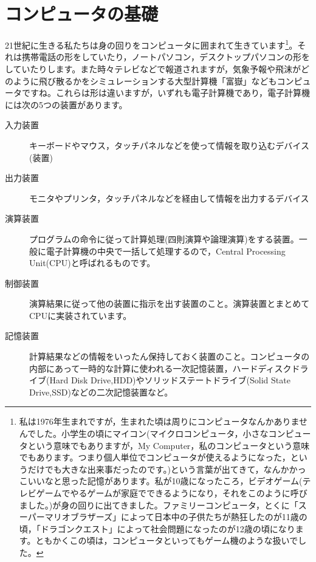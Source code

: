 \documentclass{ltjsbook}
\begin{document}
\section{コンピュータの基礎}
21世紀に生きる私たちは身の回りをコンピュータに囲まれて生きています\footnote{私は1976年生まれですが，生まれた頃は周りにコンピュータなんかありませんでした。小学生の頃にマイコン(マイクロコンピュータ，小さなコンピュータという意味でもありますが，My Computer，私のコンピュータという意味でもあります。つまり個人単位でコンピュータが使えるようになった，というだけでも大きな出来事だったのです。)という言葉が出てきて，なんかかっこいいなと思った記憶があります。私が10歳になったころ，ビデオゲーム(テレビゲームでやるゲームが家庭でできるようになり，それをこのように呼びました。)が身の回りに出てきました。ファミリーコンピュータ，とくに「スーパーマリオブラザーズ」によって日本中の子供たちが熱狂したのが11歳の頃，「ドラゴンクエスト」によって社会問題になったのが12歳の頃になります。ともかくこの頃は，コンピュータといってもゲーム機のような扱いでした。}。それは携帯電話の形をしていたり，ノートパソコン，デスクトップパソコンの形をしていたりします。また時々テレビなどで報道されますが，気象予報や飛沫がどのように飛び散るかをシミュレーションする大型計算機「富嶽」などもコンピュータですね。これらは形は違いますが，いずれも電子計算機であり，電子計算機には次の5つの装置があります。
\begin{description}
	\item[入力装置] キーボードやマウス，タッチパネルなどを使って情報を取り込むデバイス(装置)
	\item[出力装置] モニタやプリンタ，タッチパネルなどを経由して情報を出力するデバイス
	\item[演算装置] プログラムの命令に従って計算処理(四則演算や論理演算)をする装置。一般に電子計算機の中央で一括して処理するので，Central Processing Unit(CPU)と呼ばれるものです。
	\item[制御装置] 演算結果に従って他の装置に指示を出す装置のこと。演算装置とまとめてCPUに実装されています。
	\item[記憶装置] 計算結果などの情報をいったん保持しておく装置のこと。コンピュータの内部にあって一時的な計算に使われる一次記憶装置，ハードディスクドライブ(Hard Disk Drive,HDD)やソリッドステートドライブ(Solid State Drive,SSD)などの二次記憶装置など。
\end{description}
\end{document}
